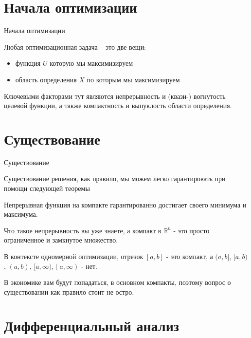 \documentclass{beamer}
\begin{document}
\section{Начала оптимизации}

\begin{frame}{Начала оптимизации}

Любая оптимизационная задача – это две вещи:

\begin{itemize}
  \item функция $U$ которую мы максимизируем
  \item область определения $X$ по которым мы максимизируем
\end{itemize}

Ключевыми факторами тут являются непрерывность и (квази-) вогнутость целевой функции, а также компактность и выпуклость области определения.

\end{frame}

\section{Существование}

\begin{frame}{Существование}

Существование решения, как правило, мы можем легко гарантировать при помощи следующей теоремы

\begin{theorem}[Вейерштрасса]

Непрерывная функция на компакте гарантированно достигает своего минимума и максимума.
\end{theorem}

Что такое \alert{непрерывность} вы уже знаете, а \alert{компакт} в $\mathbb{R}^n$ - это просто ограниченное и замкнутое множество. 

В контексте одномерной оптимизации, отрезок $[a,b]$ - это компакт, а $(a,b]$, $[a,b)$, $(a,b)$, $[a,\infty)$,$(a,\infty)$ - нет. 

В экономике вам будут попадаться, в основном компакты, поэтому вопрос о существовании как правило стоит не остро.

\end{frame}

\section{Дифференциальный анализ}
\end{document}
